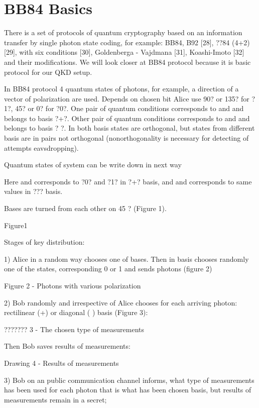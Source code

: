 \section{BB84 Basics}

There is a set of protocols of quantum cryptography based on an
information transfer by single photon state coding, for example: BB84,
B92 [28], ??84 (4+2) [29], with six conditions [30], Goldenberga -
Vajdmana [31], Koashi-Imoto [32] and their modifications. We will look
closer at BB84 protocol because it is basic protocol for our QKD
setup.

In BB84 protocol 4 quantum states of photons, for example, a direction
of a vector of polarization are used. Depends on chosen bit Alice use
90? or 135? for ?1?, 45? or 0? for ?0?. One pair of quantum conditions
corresponds to and and belongs to basis ?+?. Other pair of quantum
conditions corresponds to and and belongs to basis ? ?. In both basis
states are orthogonal, but states from different basis are in pairs
not orthogonal (nonorthogonality is necessary for detecting of
attempts eavsdropping).

Quantum states of system can be write down in next way

           
Here and corresponds to ?0? and ?1? in ?+? basis, and and corresponds
to same values in ??? basis.

Bases are turned from each other on 45 ? (Figure 1).


Figure1



Stages of key distribution:



1) Alice in a random way chooses one of bases. Then in basis chooses
randomly one of the states, corresponding 0 or 1 and sends photons
(figure 2)


Figure 2 - Photons with various polarization

2) Bob randomly and irrespective of Alice chooses for each arriving
photon: rectilinear (+) or diagonal ( ) basis (Figure 3):


??????? 3 - The chosen type of measurements

Then Bob saves results of measurements:

Drawing 4 - Results of measurements


3) Bob on an public communication channel informs, what type of
measurements has been used for each photon that is what has been
chosen basis, but results of measurements remain in a secret;

